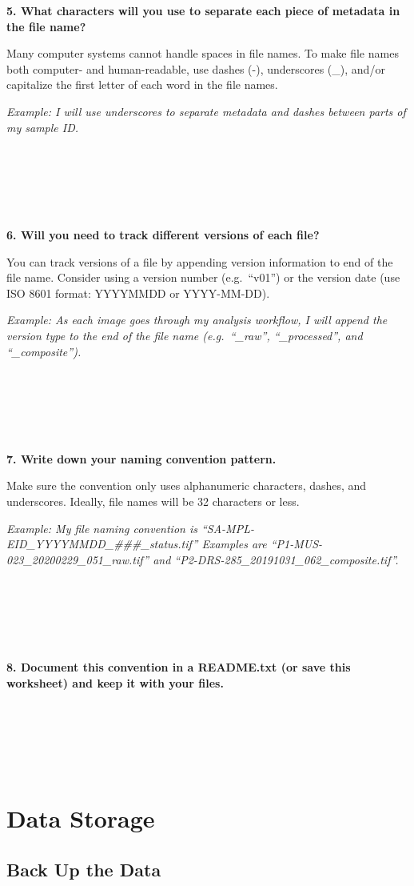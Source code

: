 \documentclass[
]{book}
\begin{document}
\textbf{5. What characters will you use to separate each piece of metadata in the file name?}

Many computer systems cannot handle spaces in file names. To make file names both computer- and human-readable, use dashes (-), underscores (\_), and/or capitalize the first letter of each word in the file names.

\emph{Example: I will use underscores to separate metadata and dashes between parts of my sample ID.}

~

~

~

\textbf{6. Will you need to track different versions of each file?}

You can track versions of a file by appending version information to end of the file name. Consider using a version number (e.g.~``v01'') or the version date (use ISO 8601 format: YYYYMMDD or YYYY-MM-DD).

\emph{Example: As each image goes through my analysis workflow, I will append the version type to the end of the file name (e.g.~``\_raw'', ``\_processed'', and ``\_composite'').}

~

~

~

\textbf{7. Write down your naming convention pattern.}

Make sure the convention only uses alphanumeric characters, dashes, and underscores. Ideally, file names will be 32 characters or less.

\emph{Example: My file naming convention is ``SA-MPL-EID\_YYYYMMDD\_\#\#\#\_status.tif'' Examples are ``P1-MUS-023\_20200229\_051\_raw.tif'' and ``P2-DRS-285\_20191031\_062\_composite.tif''.}

~

~

~

\textbf{8. Document this convention in a README.txt (or save this worksheet) and keep it with your files.}

~

~

~

\hypertarget{data-storage}{%
\chapter{Data Storage}\label{data-storage}}

\hypertarget{backup}{%
\section{Back Up the Data}\label{backup}}
\end{document}
